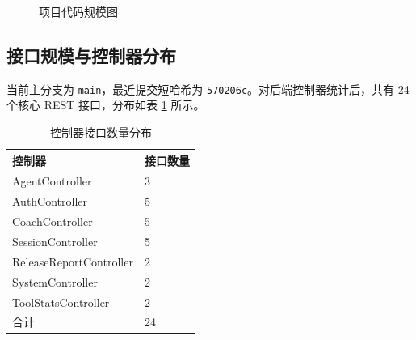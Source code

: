 \documentclass[12pt,a4paper,UTF8]{ctexart}
\begin{document}
\begin{figure}[H]
    \centering
    \caption{项目代码规模图}
    \label{fig:loc-chart}
\end{figure}

\subsection{接口规模与控制器分布}
当前主分支为 \texttt{main}，最近提交短哈希为 \texttt{570206c}。对后端控制器统计后，共有 24 个核心 REST 接口，分布如表 \ref{tab:endpoints} 所示。

\begin{table}[H]
    \centering
    \caption{控制器接口数量分布}
    \label{tab:endpoints}
    \begin{tabular}{p{3.2cm}p{2.5cm}}
        \toprule
        控制器 & 接口数量 \\
        \midrule
        AgentController & 3 \\
        AuthController & 5 \\
        CoachController & 5 \\
        SessionController & 5 \\
        ReleaseReportController & 2 \\
        SystemController & 2 \\
        ToolStatsController & 2 \\
        合计 & 24 \\
        \bottomrule
    \end{tabular}
\end{table}
\end{document}
